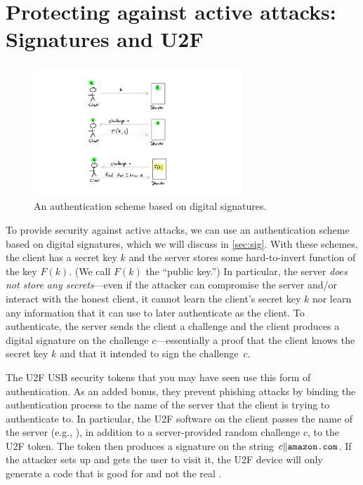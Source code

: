 \section{Protecting against active attacks: Signatures and U2F}
\begin{figure}
\centering
\includegraphics[width=0.7\textwidth]{figs/auth-active.pdf}
\caption{An authentication scheme based on digital signatures.}
\label{fig:auth-active}
\end{figure}

To provide security against active attacks, we can use an authentication
scheme based on digital signatures, which we will discuss in \cref{sec:sig}.
With these schemes, the client has a secret key $k$ and the server stores
some hard-to-invert function of the key $F(k)$.
(We call $F(k)$ the ``public key.'')
In particular, the server \emph{does not store any secrets}---even if the attacker
can compromise the server and/or interact with the honest client, it cannot learn the client's secret key $k$
nor learn any information that it can use to later authenticate as the client.
To authenticate, the server sends the client a challenge and the client produces
a digital signature on the challenge $c$---essentially a proof that the client knows the 
secret key $k$ and that it intended to sign the challenge~$c$.

The U2F USB security tokens that you may have seen use this form of authentication.
As an added bonus, they prevent phishing attacks by binding the authentication process
to the name of the server that the client is trying to authenticate to.
In particular, the U2F software on the client passes the name of the server (e.g., ),
in addition to a server-provided random challenge $c$, to the U2F token.
The token then produces a signature on the string $c\|\ttt{amazon.com}$.
If the attacker sets up  and gets the user to visit it,
the U2F device will only generate a code that is good for 
and not the real . 



